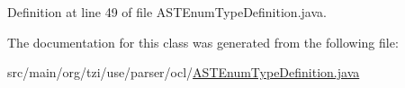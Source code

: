 Definition at line 49 of file A\-S\-T\-Enum\-Type\-Definition.\-java.



The documentation for this class was generated from the following file\-:\begin{DoxyCompactItemize}
\item 
src/main/org/tzi/use/parser/ocl/\hyperlink{_a_s_t_enum_type_definition_8java}{A\-S\-T\-Enum\-Type\-Definition.\-java}\end{DoxyCompactItemize}
